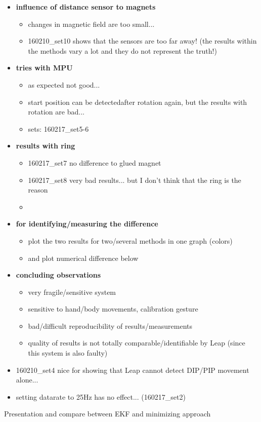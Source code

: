 \begin{itemize}
%
\item \textbf{influence of distance sensor to magnets}
	\begin{itemize}
	\item changes in magnetic field are too small...
	\item 160210\_set10 shows that the sensors are too far away! (the results within the methods vary a lot and they do not represent the truth!)
	\end{itemize}

%
\item \textbf{tries with MPU}
	\begin{itemize}
	\item as expected not good...
	\item start position can be \grqq detected\grqq after rotation again, but the results with rotation are bad...
	\item sets: 160217\_set5-6
	\end{itemize}

\item \textbf{results with ring}
	\begin{itemize}
	\item 160217\_set7 no difference to glued magnet
	\item 160217\_set8 very bad results... but I don't think that the ring is the reason
	\item {}
	\end{itemize}

\item \textbf{for identifying/measuring the difference}
	\begin{itemize}
	\item plot the two results for two/several methods in one graph (colors)
	\item and plot numerical difference below
	\end{itemize}

\item \textbf{concluding observations}
	\begin{itemize}
	\item very fragile/sensitive system
	\item sensitive to hand/body movements, calibration gesture
	\item bad/difficult reproducibility of results/measurements
	\item quality of results is not totally comparable/identifiable by Leap (since this system is also faulty)
	\end{itemize}

\item 160210\_set4 nice for showing that Leap cannot detect DIP/PIP movement alone...

\item setting datarate to 25Hz has no effect... (160217\_set2)

\end{itemize}

Presentation and compare between EKF and minimizing approach
